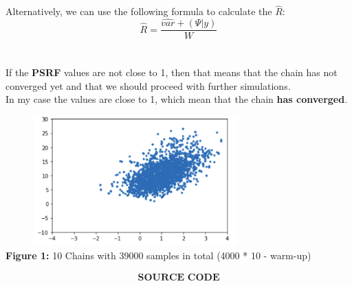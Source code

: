 \documentclass[11pt]{article}
\begin{document}
Alternatively, we can use the following formula to calculate the $ \hat{R} $:
$$ \hat{R} = \frac{\hat{var} + (\Psi | y)}{W} $$
\\~\\
If the \textbf{PSRF} values are not close to 1, then that means that the chain has not converged yet and that we should proceed with further simulations.
\\
In my case the values are close to 1, which mean that the chain \textbf{has converged}.


\begin{center}
\includegraphics[width=10cm, height=5cm]{scatter.png}
\\
\textbf{Figure 1:} 10 Chains with 39000 samples in total (4000 * 10 - warm-up)
\end{center}


\newpage
\begin{align}
\textbf{SOURCE CODE}
\end{align}
\end{document}
